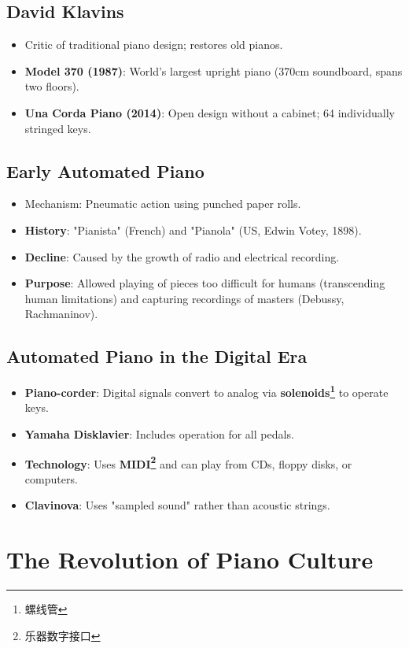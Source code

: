 \documentclass[math,code]{amznotes}
\theoremstyle{remark}
\begin{document}
\subsection{David Klavins}
\begin{itemize}
    \item Critic of traditional piano design; restores old pianos.
    \item \textbf{Model 370 (1987)}: World's largest upright piano (370cm soundboard, spans two floors).
    \item \textbf{Una Corda Piano (2014)}: Open design without a cabinet; 64 individually stringed keys.
\end{itemize}

\subsection{Early Automated Piano}
\begin{itemize}
    \item Mechanism: Pneumatic action using punched paper rolls.
    \item \textbf{History}: "Pianista" (French) and "Pianola" (US, Edwin Votey, 1898).
    \item \textbf{Decline}: Caused by the growth of radio and electrical recording.
    \item \textbf{Purpose}: Allowed playing of pieces too difficult for humans (transcending human limitations) and capturing recordings of masters (Debussy, Rachmaninov).
\end{itemize}

\subsection{Automated Piano in the Digital Era}
\begin{itemize}
    \item \textbf{Piano-corder}: Digital signals convert to analog via \textbf{solenoids\footnote{螺线管}} to operate keys.
    \item \textbf{Yamaha Disklavier}: Includes operation for all pedals.
    \item \textbf{Technology}: Uses \textbf{MIDI\footnote{乐器数字接口}} and can play from CDs, floppy disks, or computers.
    \item \textbf{Clavinova}: Uses "sampled sound" rather than acoustic strings.
\end{itemize}

\section{The Revolution of Piano Culture}
\end{document}
